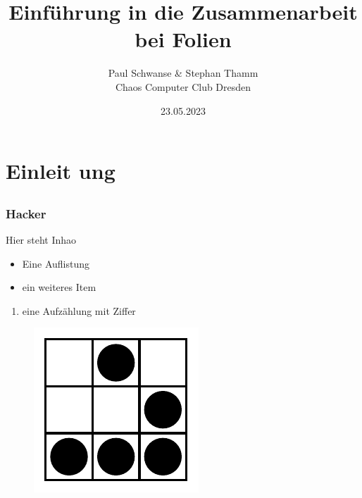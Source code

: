 \documentclass[12pt]{beamer}
\title{Einführung in die Zusammenarbeit bei Folien}
\author{\small Paul Schwanse \& Stephan Thamm\\\large Chaos Computer Club Dresden}
\date{23.05.2023}
\begin{document}
\maketitle

\section{Einleit ung}
\subsection{} 

\begin{frame}
  \frametitle{Hacker}
  Hier steht Inhao
  \begin{itemize}
	  \item Eine Auflistung
	  \item ein weiteres Item
  \end{itemize}
  \begin{enumerate}
	  \item eine Aufzählung mit Ziffer
  \end{enumerate}
  \begin{figure}
    \includegraphics[height=0.7\textheight]{img/Glider.pdf}
  \end{figure}
\end{frame}
\end{document}
